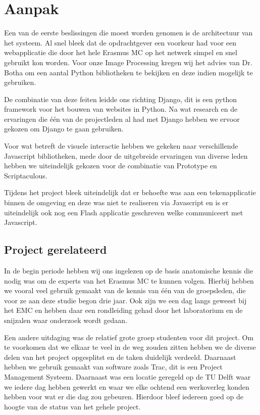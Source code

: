\section{Aanpak}
\label{Aanpak}
Een van de eerste beslissingen die moest worden genomen is de architectuur van het systeem. Al snel bleek dat de opdrachtgever een voorkeur had voor een webapplicatie die door het hele Erasmus MC op het netwerk simpel en snel gebruikt kon worden. 
Voor onze Image Processing kregen wij het advies van Dr. Botha om een aantal Python bibliotheken te bekijken en deze indien mogelijk te gebruiken. 

De combinatie van deze feiten leidde ons richting Django, dit is een python framework voor het bouwen van websites in Python. Na wat research en de ervaringen die \'{e}\'{e}n van de projectleden al had met Django hebben we ervoor gekozen om Django te gaan gebruiken. 

Voor wat betreft de visuele interactie hebben we gekeken naar verschillende Javascript bibliotheken, mede door de uitgebreide ervaringen van diverse leden hebben we uiteindelijk gekozen voor de combinatie van Prototype en Scriptaculous.

Tijdens het project bleek uiteindelijk dat er behoefte was aan een tekenapplicatie binnen de omgeving en deze was niet te realiseren via Javascript en is er uiteindelijk ook nog een Flash applicatie geschreven welke communiceert met Javascript.

\subsection{Project gerelateerd}
In de begin periode hebben wij ons ingelezen op de basis anatomische kennis die nodig was om de experts van het Erasmus MC te kunnen volgen. Hierbij hebben we vooral veel gebruik gemaakt van de kennis van \'{e}\'{e}n van de groepsleden, die voor ze aan deze studie begon drie jaar. Ook zijn we een dag langs geweest bij het EMC en hebben daar een rondleiding gehad door het laboratorium en de snijzalen waar onderzoek wordt gedaan. 

Een andere uitdaging was de relatief grote groep studenten voor dit project. Om te voorkomen dat we elkaar te veel in de weg zouden zitten hebben we de diverse delen van het project opgesplitst en de taken duidelijk verdeeld. Daarnaast hebben we gebruik gemaakt van software zoals Trac, dit is een Project Management Systeem. Daarnaast was een locatie geregeld op de TU Delft waar we iedere dag hebben gewerkt en waar we elke ochtend een werkoverleg konden hebben voor wat er die dag zou gebeuren. Hierdoor bleef iedereen goed op de hoogte van de status van het gehele project.

